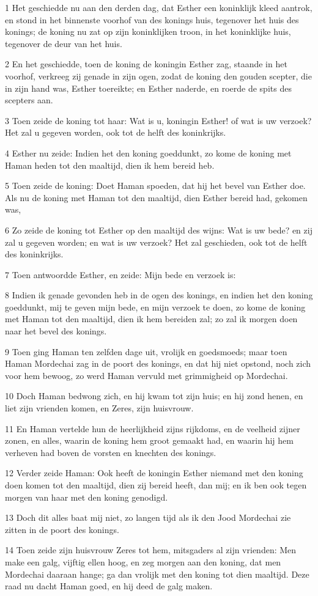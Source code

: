 \par 1 Het geschiedde nu aan den derden dag, dat Esther een koninklijk kleed aantrok, en stond in het binnenste voorhof van des konings huis, tegenover het huis des konings; de koning nu zat op zijn koninklijken troon, in het koninklijke huis, tegenover de deur van het huis.
\par 2 En het geschiedde, toen de koning de koningin Esther zag, staande in het voorhof, verkreeg zij genade in zijn ogen, zodat de koning den gouden scepter, die in zijn hand was, Esther toereikte; en Esther naderde, en roerde de spits des scepters aan.
\par 3 Toen zeide de koning tot haar: Wat is u, koningin Esther! of wat is uw verzoek? Het zal u gegeven worden, ook tot de helft des koninkrijks.
\par 4 Esther nu zeide: Indien het den koning goeddunkt, zo kome de koning met Haman heden tot den maaltijd, dien ik hem bereid heb.
\par 5 Toen zeide de koning: Doet Haman spoeden, dat hij het bevel van Esther doe. Als nu de koning met Haman tot den maaltijd, dien Esther bereid had, gekomen was,
\par 6 Zo zeide de koning tot Esther op den maaltijd des wijns: Wat is uw bede? en zij zal u gegeven worden; en wat is uw verzoek? Het zal geschieden, ook tot de helft des koninkrijks.
\par 7 Toen antwoordde Esther, en zeide: Mijn bede en verzoek is:
\par 8 Indien ik genade gevonden heb in de ogen des konings, en indien het den koning goeddunkt, mij te geven mijn bede, en mijn verzoek te doen, zo kome de koning met Haman tot den maaltijd, dien ik hem bereiden zal; zo zal ik morgen doen naar het bevel des konings.
\par 9 Toen ging Haman ten zelfden dage uit, vrolijk en goedsmoeds; maar toen Haman Mordechai zag in de poort des konings, en dat hij niet opstond, noch zich voor hem bewoog, zo werd Haman vervuld met grimmigheid op Mordechai.
\par 10 Doch Haman bedwong zich, en hij kwam tot zijn huis; en hij zond henen, en liet zijn vrienden komen, en Zeres, zijn huisvrouw.
\par 11 En Haman vertelde hun de heerlijkheid zijns rijkdoms, en de veelheid zijner zonen, en alles, waarin de koning hem groot gemaakt had, en waarin hij hem verheven had boven de vorsten en knechten des konings.
\par 12 Verder zeide Haman: Ook heeft de koningin Esther niemand met den koning doen komen tot den maaltijd, dien zij bereid heeft, dan mij; en ik ben ook tegen morgen van haar met den koning genodigd.
\par 13 Doch dit alles baat mij niet, zo langen tijd als ik den Jood Mordechai zie zitten in de poort des konings.
\par 14 Toen zeide zijn huisvrouw Zeres tot hem, mitsgaders al zijn vrienden: Men make een galg, vijftig ellen hoog, en zeg morgen aan den koning, dat men Mordechai daaraan hange; ga dan vrolijk met den koning tot dien maaltijd. Deze raad nu dacht Haman goed, en hij deed de galg maken.

